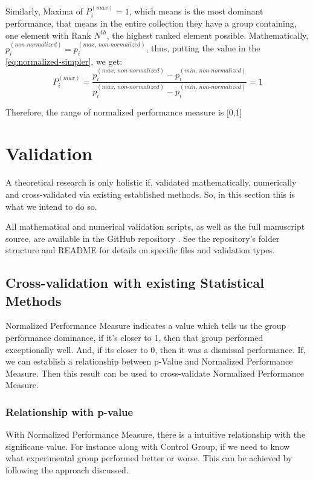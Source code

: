 \documentclass[a4paper,fleqn,review]{cas-sc}
\begin{document}
Similarly,
Maxima of $P_i^{(max)} = 1$, which means is the most dominant performance, that means in the entire collection they have a group containing, one element with Rank $N^{th}$, the highest ranked element possible. Mathematically, $p_i^{(non\text{-}normalized)} =  p_i^{(max, \, non\text{-}normalized)}$, thus, putting the value in the \autoref{eq:normalized-simpler}, we get:
\begin{equation}
	P_i^{(max)} = \frac{p_i^{(max, \, non\text{-}normalized)} - p_i^{(min, \, non\text{-}normalized)}}{p_i^{(max, \, non\text{-}normalized)} - p_i^{(min, \, non\text{-}normalized)}} = 1
\end{equation}

Therefore, the range of normalized performance measure is [0,1]


\section{Validation}
A theoretical research is only holistic if, validated mathematically, numerically and cross-validated via existing established methods. So, in this section this is what we intend to do so.

All mathematical and numerical validation scripts, as well as the full manuscript source, are available in the GitHub repository \cite{silentkarmi2025normalized}. See the repository's folder structure and README for details on specific files and validation types.

\subsection{Cross-validation with existing Statistical Methods}
Normalized Performance Measure indicates a value which tells us the group performance dominance, if it's closer to 1, then that group performed exceptionally well. And, if its closer to 0, then it was a dismissal performance. If, we can establish a relationship between p-Value and Normalized Performance Measure. Then this result can be used to cross-validate Normalized Performance Measure.

\subsubsection{Relationship with p-value}
With Normalized Performance Measure, there is a intuitive relationship with the significane value. For instance along with Control Group, if we need to know what experimental group performed better or worse. This can be achieved by following the approach discussed.
\end{document}
